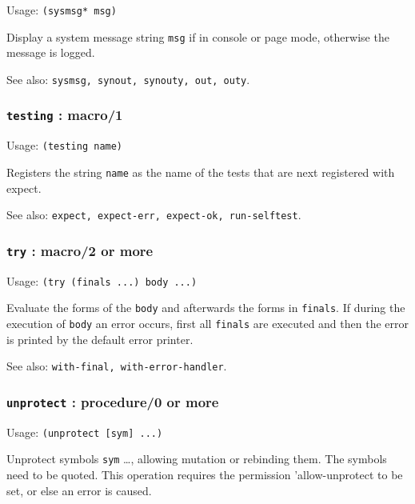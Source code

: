 \documentclass[
]{article}
\newcommand{\passthrough}[1]{#1}
\begin{document}
Usage: \passthrough{\lstinline!(sysmsg* msg)!}

Display a system message string \passthrough{\lstinline!msg!} if in
console or page mode, otherwise the message is logged.

See also: \passthrough{\lstinline!sysmsg, synout, synouty, out, outy!}.

\hypertarget{testing-macro1}{%
\subsubsection{\texorpdfstring{\texttt{testing} :
macro/1}{testing : macro/1}}\label{testing-macro1}}

Usage: \passthrough{\lstinline!(testing name)!}

Registers the string \passthrough{\lstinline!name!} as the name of the
tests that are next registered with expect.

See also:
\passthrough{\lstinline!expect, expect-err, expect-ok, run-selftest!}.

\hypertarget{try-macro2-or-more}{%
\subsubsection{\texorpdfstring{\texttt{try} : macro/2 or
more}{try : macro/2 or more}}\label{try-macro2-or-more}}

Usage: \passthrough{\lstinline!(try (finals ...) body ...)!}

Evaluate the forms of the \passthrough{\lstinline!body!} and afterwards
the forms in \passthrough{\lstinline!finals!}. If during the execution
of \passthrough{\lstinline!body!} an error occurs, first all
\passthrough{\lstinline!finals!} are executed and then the error is
printed by the default error printer.

See also: \passthrough{\lstinline!with-final, with-error-handler!}.

\hypertarget{unprotect-procedure0-or-more}{%
\subsubsection{\texorpdfstring{\texttt{unprotect} : procedure/0 or
more}{unprotect : procedure/0 or more}}\label{unprotect-procedure0-or-more}}

Usage: \passthrough{\lstinline!(unprotect [sym] ...)!}

Unprotect symbols \passthrough{\lstinline!sym!} \ldots, allowing
mutation or rebinding them. The symbols need to be quoted. This
operation requires the permission 'allow-unprotect to be set, or else an
error is caused.
\end{document}
